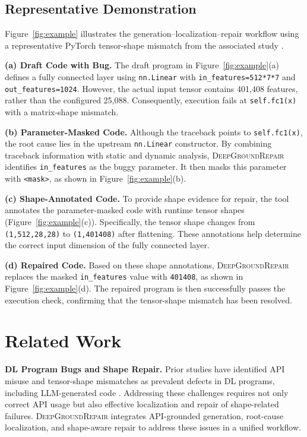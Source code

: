 \documentclass[10pt,conference]{IEEEtran}
\begin{document}
\subsection{Representative Demonstration}
Figure~\ref{fig:example} illustrates the generation--localization--repair workflow using a representative PyTorch tensor-shape mismatch from the associated study \cite{deepgroundrepair}.

\noindent\textbf{(a) Draft Code with Bug.}
The draft program in Figure~\ref{fig:example}(a) defines a fully connected layer using \texttt{nn.Linear} with \texttt{in\_features=512*7*7} and \texttt{out\_features=1024}. However, the actual input tensor contains 401,408 features, rather than the configured 25,088. Consequently, execution fails at \texttt{self.fc1(x)} with a matrix-shape mismatch.

\noindent\textbf{(b) Parameter-Masked Code.}
Although the traceback points to \texttt{self.fc1(x)}, the root cause lies in the upstream \texttt{nn.Linear} constructor. By combining traceback information with static and dynamic analysis, \textsc{DeepGroundRepair} identifies \texttt{in\_features} as the buggy parameter. It then masks this parameter with \texttt{<mask>}, as shown in Figure~\ref{fig:example}(b).

\noindent\textbf{(c) Shape-Annotated Code.}
To provide shape evidence for repair, the tool annotates the parameter-masked code with runtime tensor shapes (Figure~\ref{fig:example}(c)). Specifically, the tensor shape changes from \texttt{(1,512,28,28)} to \texttt{(1,401408)} after flattening. These annotations help determine the correct input dimension of the fully connected layer.

\noindent\textbf{(d) Repaired Code.}
Based on these shape annotations, \textsc{DeepGroundRepair} replaces the masked \texttt{in\_features} value with \texttt{401408}, as shown in Figure~\ref{fig:example}(d). The repaired program is then successfully passes the execution check, confirming that the tensor-shape mismatch has been resolved.


\section{Related Work}
\noindent\textbf{DL Program Bugs and Shape Repair.}
Prior studies have identified API misuse and tensor-shape mismatches as prevalent defects in DL programs, including LLM-generated code \cite{islambugs,humbatova2020,wei2022dlapi,DeepEval}. Addressing these challenges requires not only correct API usage but also effective localization and repair of shape-related failures. \textsc{DeepGroundRepair} integrates API-grounded generation, root-cause localization, and shape-aware repair to address these issues in a unified workflow.
\end{document}
